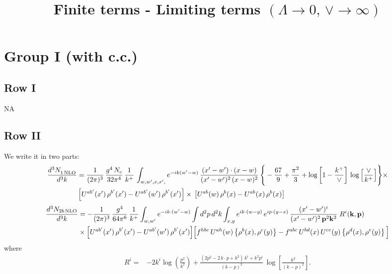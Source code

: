 \documentclass[9pt]{article}
\title{Finite terms - Limiting terms $(\Lambda\to 0,\, \vee \to \infty)$}
\author{}
\date{}
\numberwithin{equation}{section}
\begin{document}
\maketitle
\section{Group I (with c.c.)}
\subsection{Row I}
\textsc{NA}
\subsection{Row II}
We write it in two parts:
\begin{align}
     \frac{d^{3}N_{1\,\rm NLO}^{\rm}}{d^{3}k} &  =  \frac{1}{(2\pi)^{3}}\, \frac{g^{4}\,N_{c}}{32\pi^{4}}\,\frac{1}{k^{+}}\, \int_{w, w',x,x',} e^{-ik(w^\prime-w)}\, \frac{(x'-w')\cdot (x-w)}{(x'-w')^{2}\, (x-w)^{2}}\, \Bigg\{ -\frac{67}{9}+\frac{\pi^{2}}{3}+\log{\left[1-\frac{k^{+}}{\vee}\right]}\,\log{\left[\frac{\vee}{k^{+}}\right]}\Bigg\}\times\notag \\ & \left[U^{ab'}(x')\,\rho^{b'}(x') - U^{ab'}(w')\,\rho^{b'}(x')\right]\times\,\left[U^{ab}(w)\,\rho^{b}(x) - U^{ab}(x)\,\rho^{b}(x)\right]
\end{align}  
\begin{align}
\frac{d^{3}N_{2b\,\rm NLO}}{d^{3}k} & = -\frac{1}{(2\pi)^{3}}\,\frac{g^{4}}{64\pi^{6}}\,\frac{1}{k^{+}}\int_{w,w'} e^{-ik\cdot(w'-w)}
\int d^{2}p\,d^{2}k\int_{x,y} e^{ik\cdot(w-y)}\,e^{ip\cdot(y-x)}\,\frac{(x'-w')^{i}}{(x'-w')^{2}\,\mathbf{p}^{2}\mathbf{k}^{2}}\;R^{i}(\mathbf{k},\mathbf{p})\notag\\
&\times\Big[U^{ab'}(x')\,\rho^{b'}(x')-U^{ab'}(w')\,\rho^{b'}(x')\Big]
\Big[f^{hbc}\,U^{ah}(w)\left\{\rho^{b}(x),\rho^{c}(y)\right\}-f^{abc}\,U^{bd}(x)\,U^{ce}(y)\left\{\rho^{d}(x),\rho^{e}(y)\right\}\Big]
\end{align}
where
\begin{align}
R^{i} =& -2k^{i}\log\left(\frac{p^{2}}{k^{2}}\right)
+\frac{(2p^{2}-2\,k\cdot p+k^{2})\,k^{i}+k^{2}p^{i}}{(k-p)^{2}}\,
\log\left[\frac{k^{2}}{(k-p)^{2}}\right].
\end{align}
\end{document}
